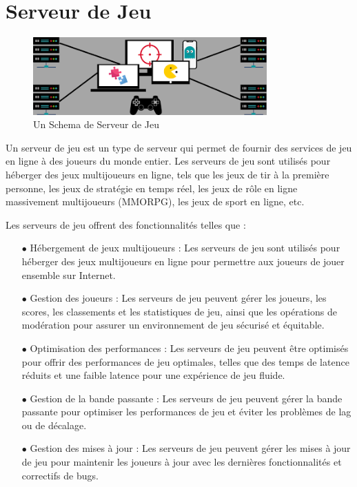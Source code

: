 \section{Serveur de Jeu} 
	\begin{figure}[h]
		\begin{center}
\includegraphics[width=0.8\textwidth]{PhotoMemoire/serveur_jeux.png}
\caption{Un Schema de Serveur de Jeu \cite{7}}
	\end{center}
	\end{figure}
		
Un serveur de jeu est un type de serveur qui permet de fournir des services de jeu en ligne à des joueurs du monde entier. Les serveurs de jeu sont utilisés pour héberger des jeux multijoueurs en ligne, tels que les jeux de tir à la première personne, les jeux de stratégie en temps réel, les jeux de rôle en ligne massivement multijoueurs (MMORPG), les jeux de sport en ligne, etc.

Les serveurs de jeu offrent des fonctionnalités telles que :
\begin{enumerate}
	
  \item[$\bullet$] Hébergement de jeux multijoueurs : Les serveurs de jeu sont utilisés pour héberger des jeux multijoueurs en ligne pour permettre aux joueurs de jouer ensemble sur Internet.
 
\item[$\bullet$]  Gestion des joueurs : Les serveurs de jeu peuvent gérer les joueurs, les scores, les classements et les statistiques de jeu, ainsi que les opérations de modération pour assurer un environnement de jeu sécurisé et équitable.
 
\item[$\bullet$] Optimisation des performances : Les serveurs de jeu peuvent être optimisés pour offrir des performances de jeu optimales, telles que des temps de latence réduits et une faible latence pour une expérience de jeu fluide.
 
\item[$\bullet$]  Gestion de la bande passante : Les serveurs de jeu peuvent gérer la bande passante pour optimiser les performances de jeu et éviter les problèmes de lag ou de décalage.
 
\item[$\bullet$]  Gestion des mises à jour : Les serveurs de jeu peuvent gérer les mises à jour de jeu pour maintenir les joueurs à jour avec les dernières fonctionnalités et correctifs de bugs.
 
\end{enumerate}


